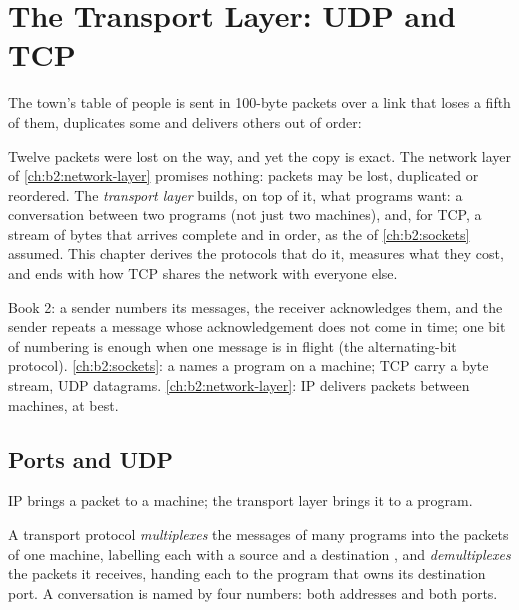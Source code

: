 \chapter{The Transport Layer: UDP and TCP}\label{ch:b2:transport-layer}

The town's table of people is sent in 100-byte packets over a link that loses a fifth of them, duplicates some and
delivers others out of order:

\label{out:b2:transport-layer:hook}

Twelve packets were lost on the way, and yet the copy is exact. The network layer of \cref{ch:b2:network-layer}
promises nothing: packets may be lost, duplicated or reordered. The \emph{transport layer} builds, on top of it, what
programs want: a conversation between two programs (not just two machines), and, for TCP, a stream of bytes that
arrives complete and in order, as the  of \cref{ch:b2:sockets} assumed. This chapter derives the protocols
that do it, measures what they cost, and ends with how TCP shares the network with everyone else.

\begin{recall}
Book 2: a sender numbers its messages, the receiver acknowledges them, and the sender repeats a message whose
acknowledgement does not come in time; one bit of numbering is enough when one message is in flight (the
alternating-bit protocol). \cref{ch:b2:sockets}: a  names a program on a machine; TCP  carry a
byte stream, UDP  datagrams. \cref{ch:b2:network-layer}: IP delivers packets between machines, at best.
\end{recall}

\section{Ports and UDP}\label{sec:b2:transport-layer:udp}

IP brings a packet to a machine; the transport layer brings it to a program.

\begin{definition}\label{def:b2:transport-layer:demux}
A transport protocol \emph{multiplexes} the messages of many programs into the packets of one
machine, labelling each with a source and a destination \emph{}, and \emph{demultiplexes} the packets
it receives, handing each to the program that owns its destination port. A conversation is named by four numbers:
both addresses and both ports.
\end{definition}

